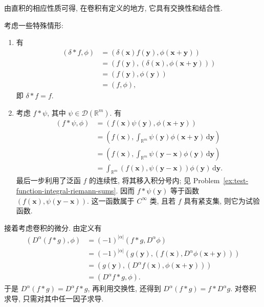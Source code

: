 由直积的相应性质可得, 在卷积有定义的地方, 它具有交换性和结合性.

考虑一些特殊情形:

\begin{enumerate}\item 有
\begin{equation}\label{eq:delta-convolution-identity-pairing}
\begin{aligned}
(\delta*f,\phi)&=(\delta(\bm{x})f(\bm{y}),\phi(\bm{x}+\bm{y}))\\
&=(f(\bm{y}),(\delta(\bm{x}),\phi(\bm{x}+\bm{y})))\\
&=(f(\bm{y}),\phi(\bm{y}))\\
&=(f,\phi),
\end{aligned}
\end{equation}
即 $\delta*f=f$.
\item 考虑 $f*\psi$, 其中 $\psi\in\mathcal{D}(\mathbb{R}^m)$. 有
\begin{equation}\label{eq:distribution-test-convolution-smooth-pairing}
\begin{aligned}
(f*\psi,\phi)&=(f(\bm{x})\psi(\bm{y}),\phi(\bm{x}+\bm{y}))\\
&=\left(f(\bm{x}),\int_{\mathbb{R}^m}\psi(\bm{y})\phi(\bm{x}+\bm{y})\,\mathrm{d}\bm{y}\right)\\
&=\left(f(\bm{x}),\int_{\mathbb{R}^m}\psi(\bm{y}-\bm{x})\phi(\bm{y})\,\mathrm{d}\bm{y}\right)\\
&=\int_{\mathbb{R}^m}(f(\bm{x}),\psi(\bm{y}-\bm{x}))\phi(\bm{y})\,\mathrm{d}\bm{y}.
\end{aligned}
\end{equation}
最后一步利用了泛函 $f$ 的连续性, 将其移入积分号内; 见 Problem~\ref{ex:test-function-integral-riemann-sums}. 因而 $f*\psi(\bm{y})$ 等于函数 $(f(\bm{x}),\psi(\bm{y}-\bm{x}))$. 这一函数属于 $C^\infty$ 类, 且若 $f$ 具有紧支集, 则它为试验函数.
\end{enumerate}

接着考虑卷积的微分. 由定义有
\begin{equation}\label{eq:distribution-convolution-derivative-pairing}
\begin{aligned}
(D^\alpha(f*g),\phi)&=(-1)^{|\alpha|}(f*g,D^\alpha\phi)\\
&=(-1)^{|\alpha|}(g(\bm{y}),(f(\bm{x}),D^\alpha\phi(\bm{x}+\bm{y})))\\
&=(g(\bm{y}),(D^\alpha f(\bm{x}),\phi(\bm{x}+\bm{y})))\\
&=(D^\alpha f*g,\phi).
\end{aligned}
\end{equation}
于是 $D^\alpha(f*g)=D^\alpha f*g$, 再利用交换性, 还得到 $D^\alpha(f*g)=f*D^\alpha g$. 对卷积求导, 只需对其中任一因子求导.

